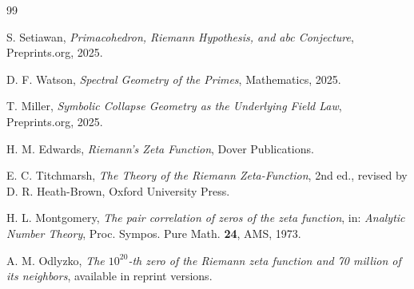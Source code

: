 \documentclass[11pt,a4paper]{amsart}
\theoremstyle{plain}
\theoremstyle{definition}
\theoremstyle{remark}
\begin{document}
	\begin{thebibliography}{99}
		
		S. Setiawan,
		\textit{Primacohedron, Riemann Hypothesis, and abc Conjecture},
		Preprints.org, 2025.
		
		D. F. Watson,
		\textit{Spectral Geometry of the Primes},
		Mathematics, 2025.
		
		T. Miller,
		\textit{Symbolic Collapse Geometry as the Underlying Field Law},
		Preprints.org, 2025.
		
		H. M. Edwards,
		\textit{Riemann's Zeta Function},
		Dover Publications.
		
		E. C. Titchmarsh,
		\textit{The Theory of the Riemann Zeta-Function},
		2nd ed., revised by D. R. Heath-Brown,
		Oxford University Press.
		
		H. L. Montgomery,
		\textit{The pair correlation of zeros of the zeta function},
		in: \textit{Analytic Number Theory}, Proc. Sympos. Pure Math. \textbf{24}, AMS, 1973.
		
		A. M. Odlyzko,
		\textit{The \(10^{20}\)-th zero of the Riemann zeta function and 70 million of its neighbors},
		available in reprint versions.
		
	\end{thebibliography}
	
\end{document}
